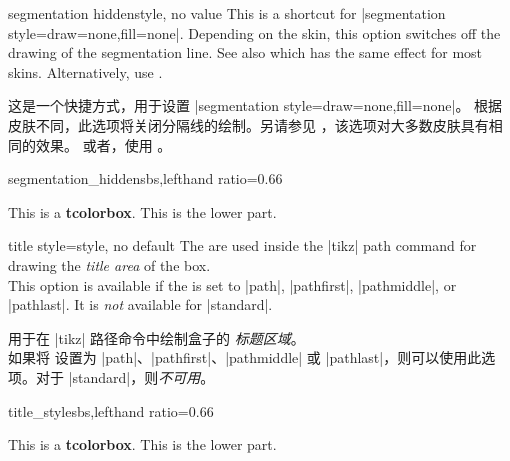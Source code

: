 \begin{docTcbKey}{segmentation hidden}{}{style, no value}
This is a shortcut for |segmentation style={draw=none,fill=none}|.
Depending on the skin, this option switches off the drawing of the
segmentation line. See also  which
has the same effect for most skins.
Alternatively, use .

这是一个快捷方式，用于设置 |segmentation style={draw=none,fill=none}|。 根据皮肤不同，此选项将关闭分隔线的绘制。另请参见 ，该选项对大多数皮肤具有相同的效果。 或者，使用 。
\begin{exdispExample*}{segmentation_hidden}{sbs,lefthand ratio=0.66}

\begin{tcolorbox}[title=My title,
enhanced,segmentation hidden]
This is a \textbf{tcolorbox}.
\tcblower
This is the lower part.
\end{tcolorbox}
\end{exdispExample*}
\end{docTcbKey}


\begin{docTcbKey}{title style}{=}{style, no default}
The  are used inside the |tikz| path command
for drawing the \emph{title area} of the box.\\
This option is available if the  is set to
|path|, |pathfirst|, |pathmiddle|, or |pathlast|.
It is \emph{not} available for |standard|.

 用于在 |tikz| 路径命令中绘制盒子的 \emph{标题区域}。\\ 如果将  设置为 |path|、|pathfirst|、|pathmiddle| 或 |pathlast|，则可以使用此选项。对于 |standard|，则\emph{不可用}。
\begin{exdispExample*}{title_style}{sbs,lefthand ratio=0.66}

\begin{tcolorbox}[enhanced,title=My title,
title style={left color=blue!15!yellow,
              right color=red!85!black}]
This is a \textbf{tcolorbox}.
\tcblower
This is the lower part.
\end{tcolorbox}
\end{exdispExample*}
\end{docTcbKey}

